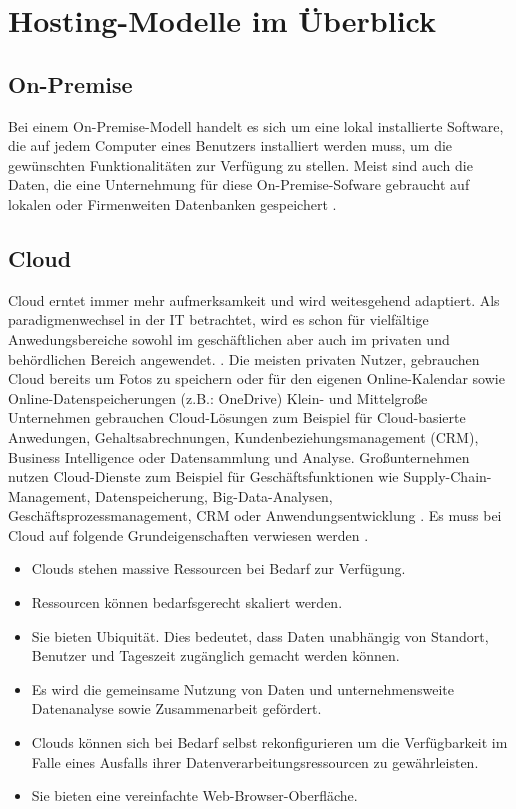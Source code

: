 \documentclass[12pt,bibtotoc]{article}
\begin{document}
	\section{Hosting-Modelle im Überblick}
		\subsection{On-Premise}
		Bei einem On-Premise-Modell handelt es sich um eine lokal installierte Software, die auf jedem Computer eines Benutzers installiert werden muss, um die gewünschten Funktionalitäten zur Verfügung zu stellen.
		Meist sind auch die Daten, die eine Unternehmung für diese On-Premise-Sofware gebraucht auf lokalen oder Firmenweiten Datenbanken gespeichert \cite{AlHayek.2020}. 
		\subsection{Cloud}
		Cloud erntet immer mehr aufmerksamkeit und wird weitesgehend adaptiert. Als paradigmenwechsel in der IT betrachtet, wird es schon für vielfältige Anwedungsbereiche sowohl im geschäftlichen aber auch im privaten und behördlichen Bereich angewendet. \cite{Murugesan.2016}.
		\newline
		Die meisten privaten Nutzer, gebrauchen Cloud bereits um Fotos zu speichern oder für den eigenen Online-Kalendar sowie Online-Datenspeicherungen (z.B.: OneDrive)
		Klein- und Mittelgroße Unternehmen gebrauchen Cloud-Lösungen zum Beispiel für Cloud-basierte Anwedungen, Gehaltsabrechnungen, Kundenbeziehungsmanagement (CRM), Business Intelligence oder Datensammlung und Analyse.
		Großunternehmen nutzen Cloud-Dienste zum Beispiel für Geschäftsfunktionen wie Supply-Chain-Management, Datenspeicherung, Big-Data-Analysen, Geschäftsprozessmanagement, CRM oder Anwendungsentwicklung \cite{Murugesan.2016}.
		\newline
			Es muss bei Cloud auf folgende Grundeigenschaften verwiesen werden \cite{Murugesan.2016}.
			\begin{itemize}
				\item Clouds stehen massive Ressourcen bei Bedarf zur Verfügung.
				\item Ressourcen können bedarfsgerecht skaliert werden.
				\item Sie bieten Ubiquität. Dies bedeutet, dass Daten unabhängig von Standort, Benutzer und Tageszeit zugänglich gemacht werden können.
				\item Es wird die gemeinsame Nutzung von Daten und unternehmensweite Datenanalyse sowie Zusammenarbeit gefördert.
				\item Clouds können sich bei Bedarf selbst rekonfigurieren um die Verfügbarkeit im Falle eines Ausfalls ihrer Datenverarbeitungsressourcen zu gewährleisten.
				\item Sie bieten eine vereinfachte Web-Browser-Oberfläche.
			\end{itemize}
\end{document}
